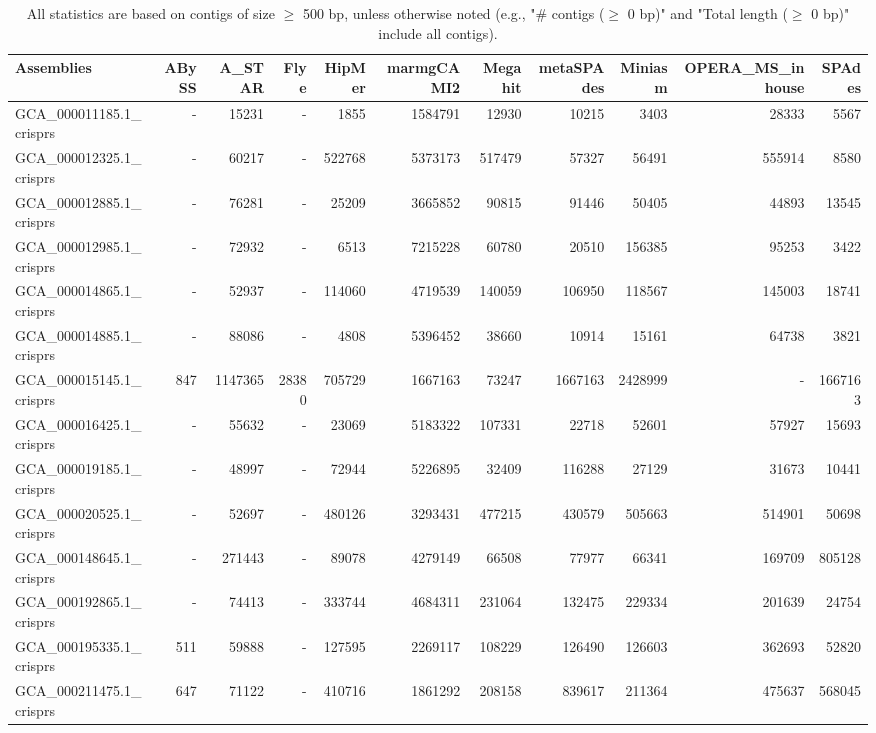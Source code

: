 \documentclass[12pt,a4paper]{article}
\begin{document}
\begin{table}[ht]
\begin{center}
\caption{All statistics are based on contigs of size $\geq$ 500 bp, unless otherwise noted (e.g., "\# contigs ($\geq$ 0 bp)" and "Total length ($\geq$ 0 bp)" include all contigs).}
\begin{tabular}{|l*{10}{|r}|}
\hline
Assemblies & ABySS & A\_STAR & Flye & HipMer & marmgCAMI2 & Megahit & metaSPAdes & Miniasm & OPERA\_MS\_inhouse & SPAdes \\ \hline
GCA\_000011185.1\_crisprs & - & 15231 & - & 1855 & 1584791 & 12930 & 10215 & 3403 & 28333 & 5567 \\ \hline
GCA\_000012325.1\_crisprs & - & 60217 & - & 522768 & 5373173 & 517479 & 57327 & 56491 & 555914 & 8580 \\ \hline
GCA\_000012885.1\_crisprs & - & 76281 & - & 25209 & 3665852 & 90815 & 91446 & 50405 & 44893 & 13545 \\ \hline
GCA\_000012985.1\_crisprs & - & 72932 & - & 6513 & 7215228 & 60780 & 20510 & 156385 & 95253 & 3422 \\ \hline
GCA\_000014865.1\_crisprs & - & 52937 & - & 114060 & 4719539 & 140059 & 106950 & 118567 & 145003 & 18741 \\ \hline
GCA\_000014885.1\_crisprs & - & 88086 & - & 4808 & 5396452 & 38660 & 10914 & 15161 & 64738 & 3821 \\ \hline
GCA\_000015145.1\_crisprs & 847 & 1147365 & 28380 & 705729 & 1667163 & 73247 & 1667163 & 2428999 & - & 1667163 \\ \hline
GCA\_000016425.1\_crisprs & - & 55632 & - & 23069 & 5183322 & 107331 & 22718 & 52601 & 57927 & 15693 \\ \hline
GCA\_000019185.1\_crisprs & - & 48997 & - & 72944 & 5226895 & 32409 & 116288 & 27129 & 31673 & 10441 \\ \hline
GCA\_000020525.1\_crisprs & - & 52697 & - & 480126 & 3293431 & 477215 & 430579 & 505663 & 514901 & 50698 \\ \hline
GCA\_000148645.1\_crisprs & - & 271443 & - & 89078 & 4279149 & 66508 & 77977 & 66341 & 169709 & 805128 \\ \hline
GCA\_000192865.1\_crisprs & - & 74413 & - & 333744 & 4684311 & 231064 & 132475 & 229334 & 201639 & 24754 \\ \hline
GCA\_000195335.1\_crisprs & 511 & 59888 & - & 127595 & 2269117 & 108229 & 126490 & 126603 & 362693 & 52820 \\ \hline
GCA\_000211475.1\_crisprs & 647 & 71122 & - & 410716 & 1861292 & 208158 & 839617 & 211364 & 475637 & 568045 \\ \hline

\end{tabular}
\end{center}
\end{table}
\end{document}
